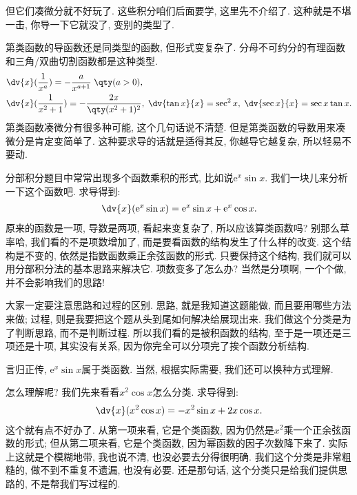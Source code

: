 \documentclass{ctexbook}
\newcommand{\e}{\mathrm{e}}
\begin{document}
{但它们凑微分就不好玩了. 这些积分咱们后面要学, 这里先不介绍了. 这种就是不堪一击, 你导一下它就没了, 变别的类型了. \par
第\uppercase\expandafter{}类函数的导函数还是同类型的函数, 但形式变复杂了. 分母不可约分的有理函数和三角/双曲切割函数都是这种类型. 
\begin{align*}
{}&\dv{x}(\frac{1}{x^{a}})=-\frac{a}{x^{a+1}}\;\qty(a>0),\\
{}&\dv{x}(\frac{1}{x^{2}+1})=-\frac{2x}{\qty(x^{2}+1)^{2}},\;\dv{\tan{x}}{x}=\sec^{2}{x},\;\dv{\sec{x}}{x}=\sec{x}\tan{x}
.\end{align*}
第\uppercase\expandafter{}类函数凑微分有很多种可能, 这个几句话说不清楚. 但是第\uppercase\expandafter{}类函数的导数用来凑微分是肯定变简单了. 这种要求导的话就是适得其反, 你越导它越复杂, 所以轻易不要动. \par
分部积分题目中常常出现多个函数乘积的形式, 比如说$\e^{x}\sin{x}$. 我们一块儿来分析一下这个函数吧. 求导得到: 
\begin{align*}
\dv{x}(\e^{x}\sin{x})=\e^{x}\sin{x}+\e^{x}\cos{x}
.\end{align*}
原来的函数是一项, 导数是两项, 看起来变复杂了, 所以应该算\uppercase\expandafter{}类函数吗? 别那么草率哈, 我们看的不是项数增加了, 而是要看函数的结构发生了什么样的改变. 这个结构是不变的, 依然是指数函数乘正余弦函数的形式. 只要保持这个结构, 我们就可以用分部积分法的基本思路来解决它. 项数变多了怎么办? 当然是分项啊, 一个个做, 并不会影响我们的思路! \par
大家一定要注意思路和过程的区别. 思路, 就是我知道这题能做, 而且要用哪些方法来做; 过程, 则是我要把这个题从头到尾如何解决给展现出来. 我们做这个分类是为了判断思路, 而不是判断过程. 所以我们看的是被积函数的结构, 至于是一项还是三项还是十项, 其实没有关系, 因为你完全可以分项完了挨个函数分析结构. \par
言归正传, $\e^{x}\sin{x}$属于\uppercase\expandafter{}类函数. 当然, 根据实际需要, 我们还可以换种方式理解. \par
怎么理解呢? 我们先来看看$x^{2}\cos{x}$怎么分类. 求导得到: 
\begin{align*}
\dv{x}(x^{2}\cos{x})=-x^{2}\sin{x}+2x\cos{x}
.\end{align*}
这个就有点不好办了. 从第一项来看, 它是个\uppercase\expandafter{}类函数, 因为仍然是$x^{2}$乘一个正余弦函数的形式; 但从第二项来看, 它是个\uppercase\expandafter{}类函数, 因为幂函数的因子次数降下来了. 实际上这就是个模糊地带, 我也说不清, 也没必要去分得很明确. 我们这个分类是非常粗糙的, 做不到不重复不遗漏, 也没有必要. 还是那句话, 这个分类只是给我们提供思路的, 不是帮我们写过程的. \par
}
\end{document}
